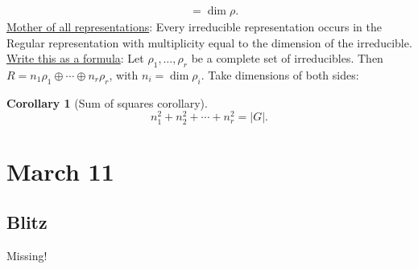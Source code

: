 \documentclass[12pt]{article}
\newtheorem{corollary}[theorem]{Corollary}
\theoremstyle{definition}
\begin{document}
\begin{enumerate}
\begin{equation}
\begin{split}
            & = \boxed{\dim \rho.}
        \end{split}
    \end{equation}
    \noindent \underline{Mother of all representations}: Every irreducible representation occurs in the Regular representation with multiplicity equal to the dimension of the irreducible.
    \newline
    \newline
    \underline{Write this as a formula}: Let $\rho_1 , \dotsc , \rho_r$ be a complete set of irreducibles. Then $R = n_1 \rho_1 \oplus \dotsb \oplus n_r \rho_r$, with $n_i = \dim \rho_i$. Take dimensions of both sides:
    \begin{corollary}[Sum of squares corollary]
        \begin{equation}
            \boxed{n_1^2 + n_2^2 + \dotsb + n_r^2 = |G|.}
        \end{equation}
    \end{corollary}
\end{enumerate}
\section{March 11}
\subsection{Blitz}
Missing!
\end{document}
